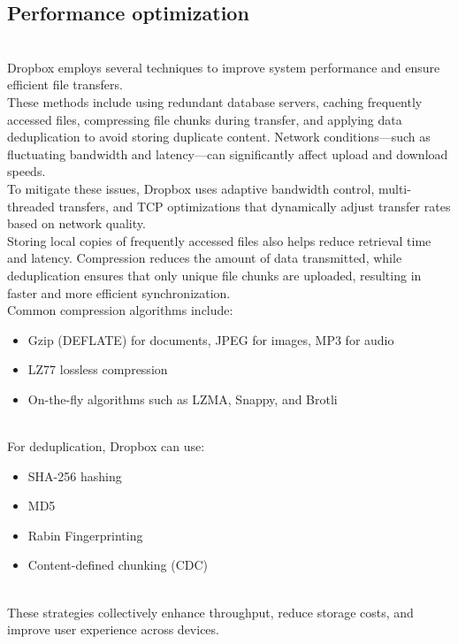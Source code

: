 \subsection{Performance optimization}\label{ttXg01Np2fG84_i4AMEIS}
\\
Dropbox employs several techniques to improve system performance and ensure efficient file transfers.
\\
These methods include using redundant database servers, caching frequently accessed files, compressing file chunks during transfer, and applying data deduplication to avoid storing duplicate content. Network conditions---such as fluctuating bandwidth and latency---can significantly affect upload and download speeds.
\\
To mitigate these issues, Dropbox uses adaptive bandwidth control, multi-threaded transfers, and TCP optimizations that dynamically adjust transfer rates based on network quality.
\\
Storing local copies of frequently accessed files also helps reduce retrieval time and latency. Compression reduces the amount of data transmitted, while deduplication ensures that only unique file chunks are uploaded, resulting in faster and more efficient synchronization.
\\
Common compression algorithms include:

\begin{itemize}
\item
\protect{}\label{RwzpFYPnAXVF8zK40x20J}
Gzip (DEFLATE) for documents, JPEG for images, MP3 for audio
\item
\protect{}\label{gMKzcIEROsBVjUbA7d3ey}
LZ77 lossless compression
\item
\protect{}\label{aqLni5_j4v2IubxJI10d1}
On-the-fly algorithms such as LZMA, Snappy, and Brotli
\end{itemize}
\\
For deduplication, Dropbox can use:

\begin{itemize}
\item
\protect{}\label{yZOEKyFu_trm-TNdnZAz9}
SHA-256 hashing
\item
\protect{}\label{4HiZkrHioU0fMsKMJ8M3O}
MD5
\item
\protect{}\label{KueDPjxbVvOWsEVt8_z-w}
Rabin Fingerprinting
\item
\protect{}\label{eH2-SKEmLv7yYBRss_qWV}
Content-defined chunking (CDC)
\end{itemize}
\\
These strategies collectively enhance throughput, reduce storage costs, and improve user experience across devices.

